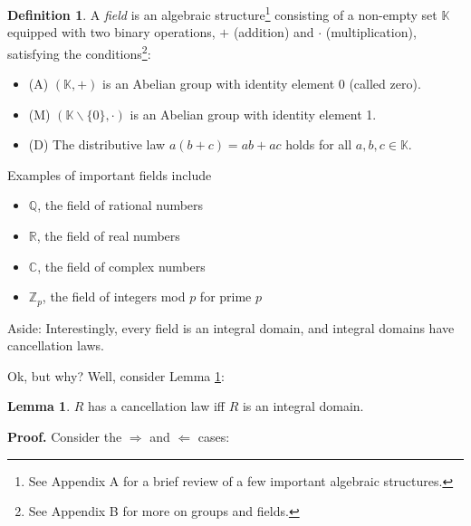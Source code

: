 \documentclass{article}
\theoremstyle{definition}
\newtheorem{definition}{Definition}[section]
\newtheorem{lemma}{Lemma}[section]
\begin{document}
\begin{definition}A \emph{field} is an algebraic
structure\footnote{See Appendix A for a brief review of a few
important algebraic structures.}  consisting of a non-empty set
$\mathbb{K}$ equipped with two binary operations, $+$ (addition)
and $\cdot$ (multiplication), satisfying the
conditions\footnote{See Appendix B for more on groups and
fields.}:

\medskip
\begin{itemize}
\item [] (A) $(\mathbb{K},+)$ is an Abelian group with identity element $0$ 
             (called zero).
\item [] (M) $(\mathbb{K} \backslash \{0\}, \cdot)$ is an Abelian group with 
             identity element 1.
\item [] (D) The distributive law $a(b+c)=ab+ac$ holds for all $a,b,c \in \mathbb{K}$.
\end{itemize}

\medskip
\noindent
Examples of important fields include

\smallskip
\begin{itemize}
\item $\mathbb{Q}$,     the field of rational numbers
\item $\mathbb{R}$,     the field of real numbers
\item $\mathbb{C}$,     the field of complex numbers
\item $\mathbb{Z}_{p}$, the field of integers mod $p$ for prime $p$ 
\end{itemize}
\end{definition}

\bigskip
\noindent
Aside: Interestingly, every field is an integral domain, and
integral domains have cancellation laws. 

\bigskip
\noindent
Ok, but why? Well, consider Lemma \ref{lemma:zero_divisors}:

\smallskip
\begin{lemma}
$R$ has a cancellation law iff $R$ is an integral domain.
\label{lemma:zero_divisors}
\end{lemma}


\noindent
\textbf{Proof.} Consider the $\Rightarrow$ and $\Leftarrow$ cases:
\end{document}
